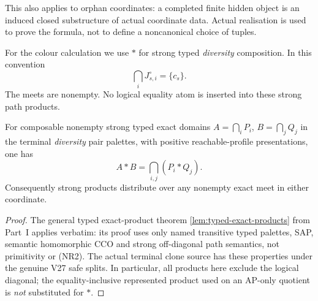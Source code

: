 This also applies to orphan coordinates: a completed finite hidden object is
an induced closed substructure of actual coordinate data. Actual realisation
is used to prove the formula, not to define a noncanonical choice of tuples.

For the colour calculation we use $*$ for strong typed \emph{diversity}
composition. In this convention
\begin{equation}\label{eq:ramsey-clone-diversity-meet}
                 \bigcap_iJ_{s,i}^\circ=\{c_s\}.
\end{equation}
The meets are nonempty. No logical equality atom is inserted into these
strong path products.

\begin{lemma}
\label{lem:ramsey-typed-distributivity}
For composable nonempty strong typed exact domains
$A=\bigcap_iP_i$, $B=\bigcap_jQ_j$ in the terminal
\emph{diversity} pair palettes, with positive reachable-profile
presentations, one has
\[
 A*B=\bigcap_{i,j}(P_i*Q_j).
\]
Consequently strong products distribute over any nonempty
exact meet in either coordinate.
\end{lemma}
\begin{proof}
The general typed exact-product theorem
\cref{lem:typed-exact-products} from Part~I applies verbatim:
its proof uses only named transitive typed palettes, SAP,
semantic homomorphic CCO and strong off-diagonal path semantics,
not primitivity or (NR2). The actual terminal clone source has
these properties under the genuine V27 safe splits. In
particular, all products here exclude the logical diagonal;
the equality-inclusive represented product used on an AP-only
quotient is \emph{not} substituted for $*$.
\end{proof}

